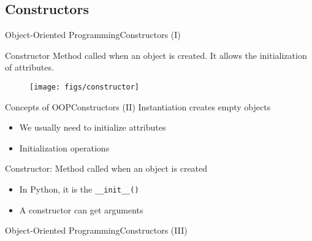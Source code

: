 \documentclass[10pt,compress]{beamer} %
\begin{document}
\subsection{Constructors}

\begin{frame}{Object-Oriented Programming}{Constructors (I)}
	\begin{block}{Constructor}
		 Method called when an object is created. It allows the initialization of attributes. 
  	\end{block}	
		\begin{figure}
			\texttt{[image: figs/constructor]}
		\end{figure}				
\end{frame}

\begin{frame}{Concepts of OOP}{Constructors (II)}
		Instantiation creates empty objects
		\begin{itemize}
			\item We usually need to initialize attributes
			\item Initialization operations
		\end{itemize}
		\alert{Constructor}: Method called when an object is created
		\begin{itemize}
			\item In Python, it is the \texttt{\_\_init\_\_()}
			\item A constructor can get arguments
		\end{itemize}
\end{frame}

\begin{frame}{Object-Oriented Programming}{Constructors (III)}
	\vspace{-0.3cm}
	\begin{exampleblock}{}
	\vspace{-0.3cm}
		
	\end{exampleblock}
\end{frame}
\end{document}
